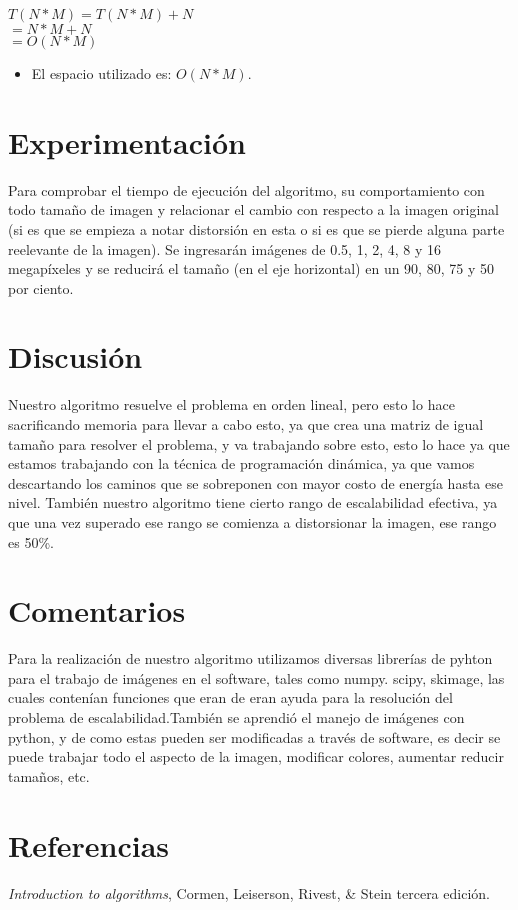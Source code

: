 \documentclass[twocolumn,11pts]{IEEEtran}
\begin{document}
$T(N*M)= T(N*M)+N$ \\
$      = N*M+N$\\
$      = O(N*M)$\\

\begin{itemize}
\item El espacio utilizado es: $O(N*M)$.
\end{itemize} 

\section{Experimentación}
Para comprobar el tiempo de ejecución del algoritmo, su comportamiento con todo tamaño de imagen y relacionar el cambio con respecto a la imagen original (si es que se empieza a notar distorsión en esta o si es que se pierde alguna parte reelevante de la imagen). Se ingresarán imágenes de 0.5, 1, 2, 4, 8 y 16 megapíxeles y se reducirá el tamaño (en el eje horizontal) en un 90, 80, 75 y 50 por ciento.

\section{Discusión}
Nuestro algoritmo resuelve el problema en orden lineal, pero esto lo hace sacrificando memoria para llevar a cabo esto, ya que crea una matriz de igual tamaño para resolver el problema, y va trabajando sobre esto, esto lo hace ya que estamos trabajando con la técnica de programación dinámica, ya que vamos descartando los caminos que se sobreponen con mayor costo de energía hasta ese nivel. También nuestro algoritmo tiene cierto rango de escalabilidad efectiva, ya que una vez superado ese rango se comienza a distorsionar la imagen, ese rango es 50\%.
\section{Comentarios}
Para la realización de nuestro algoritmo utilizamos diversas librerías de pyhton para el trabajo de imágenes en el software, tales como numpy. scipy, skimage, las cuales contenían funciones que eran de eran ayuda para la resolución del problema de escalabilidad.También se aprendió el manejo de imágenes con python, y de como estas pueden ser modificadas a través de software, es decir se puede trabajar todo el aspecto de la imagen, modificar colores, aumentar reducir tamaños, etc.
\section{Referencias}
\textit {Introduction to algorithms}, Cormen, Leiserson, Rivest, \& Stein tercera edición.

%
%


\end{document}
